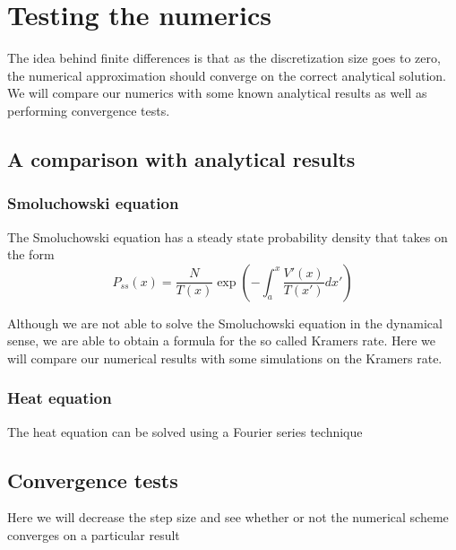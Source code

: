 \chapter{Testing the numerics}

The idea behind finite differences is that as the discretization size goes to zero, the numerical approximation should converge on the correct analytical solution. We will compare our numerics with some known analytical results as well as performing convergence tests.
\section{A comparison with analytical results}
\subsection{Smoluchowski equation}
The Smoluchowski equation has a steady state probability density that takes on the form \cite{DasDasBarikEtAl2015}
\begin{equation}
P_{ss}(x) = \frac{N}{T(x)} \exp{\left(-\int_a^x \frac{V'(x)}{T(x')} dx' \right)}
\end{equation}

Although we are not able to solve the Smoluchowski equation in the dynamical sense, we are able to obtain a formula for the so called Kramers rate. Here we will compare our numerical results with some simulations on the Kramers rate.

\subsection{Heat equation}
The heat equation can be solved using a Fourier series technique

\section{Convergence tests}
Here we will decrease the step size and see whether or not the numerical scheme converges on a particular result